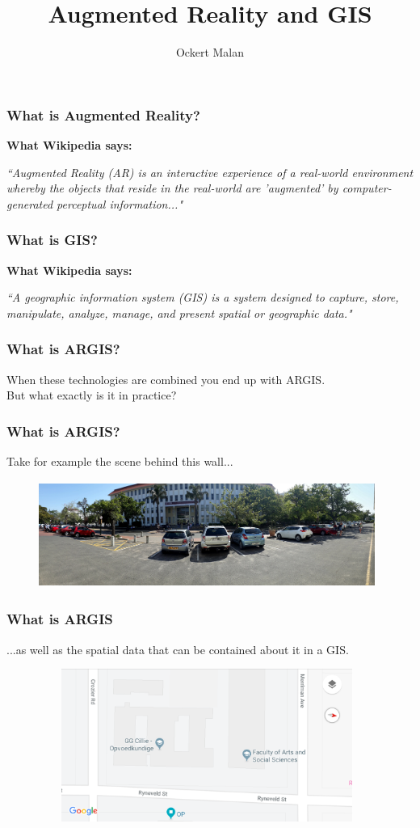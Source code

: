 \documentclass[10pt, compress]{beamer}
\title{Augmented Reality and GIS}
\subtitle{}
\author{Ockert Malan}
\institute{Presentiation as part of Scientific Computing 372 and Geo-Information Technology 341}
\newcommand\myheading[1]{%
  \par\bigskip
  {\Large\bfseries#1}\par\smallskip}
\begin{document}
\maketitle

\begin{frame}[fragile]
\frametitle{What is Augmented Reality?}
\myheading{What Wikipedia says:}
\textit{``Augmented Reality (AR) is an interactive experience of a real-world environment whereby the objects that reside in the real-world are 'augmented' by computer-generated perceptual information..."}
\end{frame}

\begin{frame}[fragile]
\frametitle{What is GIS?}
\myheading{What Wikipedia says:}
\textit{``A geographic information system (GIS) is a system designed to capture, store, manipulate, analyze, manage, and present spatial or geographic data."}
\end{frame}

\begin{frame}[fragile]
\frametitle{What is ARGIS?}
When these technologies are combined you end up with ARGIS.\\

But what exactly is it in practice?
\end{frame}

\begin{frame}[fragile]
  \frametitle{What is ARGIS?}
  Take for example the scene behind this wall...
\begin{figure}
  \centering
 \includegraphics[width=11cm,height=3.5cm]{1.jpg}
\end{figure}
\end{frame}

\begin{frame}[fragile]
  \frametitle{What is ARGIS}
  ...as well as the spatial data that can be contained about it in a GIS.
\begin{figure}
  \centering
 \includegraphics[width=11cm,height=5cm]{2.png}
\end{figure}
\end{frame}
\end{document}

